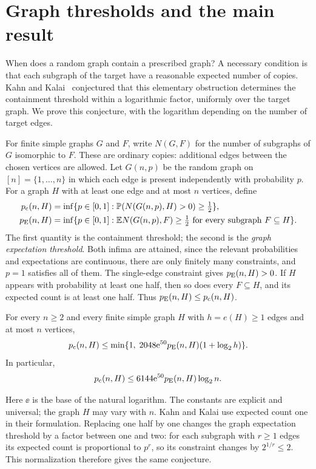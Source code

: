 \section{Graph thresholds and the main result}\label{sec:introduction}

When does a random graph contain a prescribed graph? A necessary
condition is that each subgraph of the target have a reasonable expected
number of copies. Kahn and Kalai~\cite{KK07} conjectured
that this elementary obstruction determines the containment threshold
within a logarithmic factor, uniformly over the target graph. We prove
this conjecture, with the logarithm depending on the number of target
edges.

For finite simple graphs $G$ and $F$, write $N(G,F)$ for the number of
subgraphs of $G$ isomorphic to $F$. These are ordinary copies: additional
edges between the chosen vertices are allowed. Let $G(n,p)$ be the
random graph on $[n]=\{1,\ldots,n\}$ in which each edge is present
independently with probability $p$. For a graph $H$ with at least one
edge and at most $n$ vertices, define
\begin{align*}
 p_{\mathrm c}(n,H)
 &=\inf\{p\in[0,1]:\mathbb P(N(G(n,p),H)>0)\ge\tfrac12\},\\
 p_{\mathrm E}(n,H)
 &=\inf\{p\in[0,1]:\mathbb E N(G(n,p),F)\ge\tfrac12
                 \text{ for every subgraph }F\subseteq H\}.
\end{align*}
The first quantity is the containment threshold; the second is the
\emph{graph expectation threshold}. Both infima are attained, since the
relevant probabilities and expectations are continuous, there are only
finitely many constraints, and $p=1$ satisfies all of them. The
single-edge constraint gives $p_{\mathrm E}(n,H)>0$. If $H$ appears with
probability at least one half, then so does every $F\subseteq H$, and
its expected count is at least one half. Thus $p_{\mathrm E}(n,H)\le p_{\mathrm c}(n,H)$.

\begin{theorem}\label{thm:main}
For every $n\ge2$ and every finite simple graph $H$ with $h=e(H)\ge1$
edges and at most $n$ vertices,
\begin{equation}\label{eq:stronger}
 p_{\mathrm c}(n,H)\le
 \min\{1,\;2048\mathrm e^{50}p_{\mathrm E}(n,H)(1+\log_2 h)\}.
\end{equation}
In particular,
\[
 p_{\mathrm c}(n,H)\le6144\mathrm e^{50}p_{\mathrm E}(n,H)\log_2 n.
\]
\end{theorem}

Here $\ee$ is the base of the natural logarithm. The constants are
explicit and universal; the graph $H$ may vary with $n$.
Kahn and Kalai use expected count one in their formulation. Replacing
one half by one changes the graph expectation threshold by a factor
between one and two: for each subgraph with $r\ge1$ edges its expected
count is proportional to $p^r$, so its constraint changes by
$2^{1/r}\le2$. This normalization therefore gives the same conjecture.

